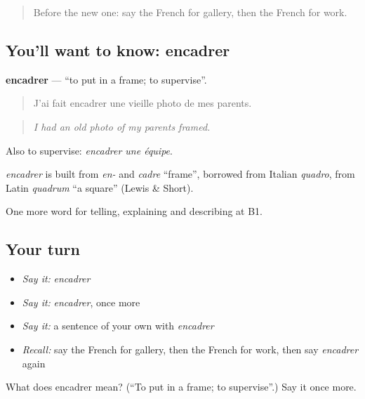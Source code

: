 \label{lesson:FR-C518-encadrer}



\begin{quote}
Before the new one: say the French for gallery, then the French for work.
\end{quote}

\subsection*{You'll want to know: encadrer}
\textbf{encadrer} — \textquotedblleft{}to put in a frame; to supervise\textquotedblright{}.

\begin{quote}
J'ai fait encadrer une vieille photo de mes parents.
\end{quote}

\begin{quote}
\emph{I had an old photo of my parents framed.}
\end{quote}

Also to supervise: \emph{encadrer une équipe}.

\begin{cousinweb}
\emph{encadrer} is built from \emph{en-} and \emph{cadre} \textquotedblleft{}frame\textquotedblright{}, borrowed from Italian \emph{quadro}, from Latin \emph{quadrum} \textquotedblleft{}a square\textquotedblright{} (Lewis \& Short).
\end{cousinweb}

\begin{grammarlens}[title={What you've built}]
One more word for telling, explaining and describing at B1.
\end{grammarlens}

\subsection*{Your turn}
\begin{itemize}
\raggedright
  \item \emph{Say it:} \emph{encadrer}
  \item \emph{Say it:} \emph{encadrer}, once more
  \item \emph{Say it:} a sentence of your own with \emph{encadrer}
  \item \emph{Recall:} say the French for gallery, then the French for work, then say \emph{encadrer} again
\end{itemize}

\begin{tcolorbox}[breakable,colback=teal!4,colframe=teal!35!black,title={Before you move on}]
What does encadrer mean? (\textquotedblleft{}To put in a frame; to supervise\textquotedblright{}.) Say it once more.
\end{tcolorbox}

